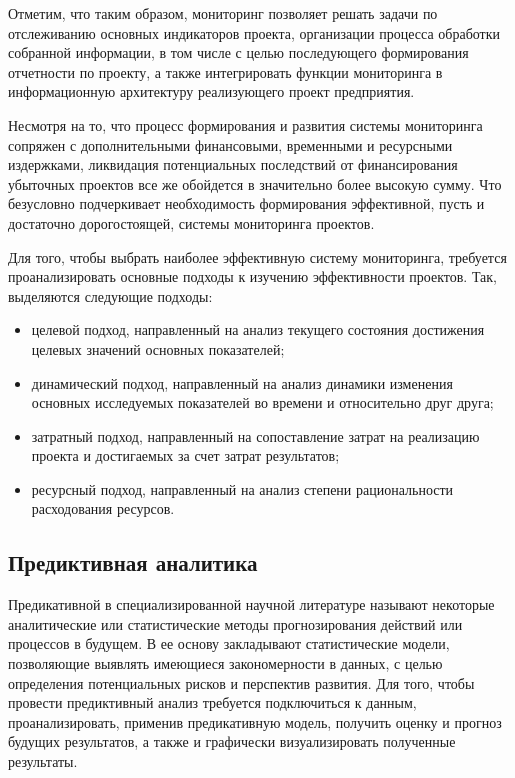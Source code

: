 \documentclass[12pt,a4paper]{article} %
\begin{document}
Отметим, что таким образом, мониторинг позволяет решать задачи по отслеживанию основных индикаторов проекта, организации процесса обработки собранной информации, в том числе с целью последующего формирования отчетности по проекту, а также интегрировать функции мониторинга в информационную архитектуру реализующего проект предприятия.

Несмотря на то, что процесс формирования и развития системы мониторинга сопряжен с дополнительными финансовыми, временными и ресурсными издержками, ликвидация потенциальных последствий от финансирования убыточных проектов все же обойдется в значительно более высокую сумму. Что безусловно подчеркивает необходимость формирования эффективной, пусть и достаточно дорогостоящей, системы мониторинга проектов.

Для того, чтобы выбрать наиболее эффективную систему мониторинга, требуется проанализировать основные подходы к изучению эффективности проектов. Так, выделяются следующие подходы\cite{Chusa}:

\begin{itemize}
	\item целевой подход, направленный на анализ текущего состояния достижения целевых значений основных показателей;
	\item динамический подход, направленный на анализ динамики изменения основных исследуемых показателей во времени и относительно друг друга;
	\item затратный подход, направленный на сопоставление затрат на реализацию проекта и достигаемых за счет затрат результатов;
	\item ресурсный подход, направленный на анализ степени рациональности расходования ресурсов. 
\end{itemize}

\subsection{Предиктивная аналитика}

Предикативной в специализированной научной литературе называют некоторые аналитические или статистические методы прогнозирования действий или процессов в будущем. В ее основу закладывают статистические модели, позволяющие выявлять имеющиеся закономерности в данных, с целью определения потенциальных рисков и перспектив развития. Для того, чтобы провести предиктивный анализ требуется подключиться к данным, проанализировать, применив предикативную модель, получить оценку и прогноз будущих результатов, а также и графически визуализировать полученные результаты.
\end{document}
